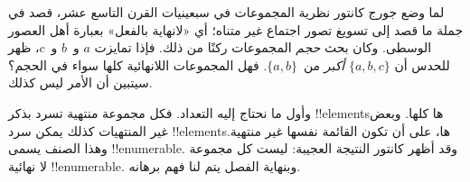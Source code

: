 \documentclass[../../../include/open-logic-section]{subfiles}
\begin{document}


لما وضع جورج كانتور نظرية المجموعات في سبعينيات القرن التاسع عشر،
قصد في جملة ما قصد إلى تسويغ تصور اجتماع غير متناه؛ أي «لانهاية
بالفعل» بعبارة أهل العصور الوسطى. وكان بحث \emph{حجم} المجموعات
ركنًا من ذلك. فإذا تمايزت $a$ و~$b$ و~$c$، ظهر للحدس أن
$\{a, b, c\}$ \emph{أكبر} من~$\{a, b\}$. فهل المجموعات
اللانهائية كلها سواء في الحجم؟ سيتبين أن الأمر ليس كذلك.

وأول ما نحتاج إليه التعداد. فكل مجموعة منتهية تسرد بذكر
!!{element}sها كلها. وبعض غير المنتهيات كذلك يمكن سرد
!!{element}sها، على أن تكون القائمة نفسها غير منتهية. وهذا الصنف
يسمى !!{enumerable}. وقد أظهر كانتور النتيجة العجيبة: ليست كل
مجموعة لا نهائية !!{enumerable}. وبنهاية الفصل يتم لنا فهم برهانه.
\end{document}

